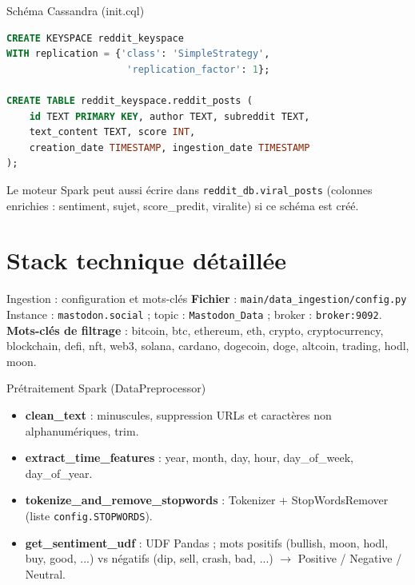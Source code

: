 \documentclass[11pt,aspectratio=169]{beamer}
\begin{document}
\begin{frame}{Schéma Cassandra (init.cql)}
  \begin{lstlisting}[language=SQL]
CREATE KEYSPACE reddit_keyspace
WITH replication = {'class': 'SimpleStrategy',
                     'replication_factor': 1};

CREATE TABLE reddit_keyspace.reddit_posts (
    id TEXT PRIMARY KEY, author TEXT, subreddit TEXT,
    text_content TEXT, score INT,
    creation_date TIMESTAMP, ingestion_date TIMESTAMP
);
  \end{lstlisting}
  Le moteur Spark peut aussi écrire dans \texttt{reddit\_db.viral\_posts} (colonnes enrichies : sentiment, sujet, score\_predit, viralite) si ce schéma est créé.
\end{frame}

\section{Stack technique détaillée}

\begin{frame}{Ingestion : configuration et mots-clés}
  \textbf{Fichier} : \texttt{main/data\_ingestion/config.py}\\
  Instance : \texttt{mastodon.social} ; topic : \texttt{Mastodon\_Data} ; broker : \texttt{broker:9092}.\\
  \vspace{0.3em}
  \textbf{Mots-clés de filtrage} : bitcoin, btc, ethereum, eth, crypto, cryptocurrency, blockchain, defi, nft, web3, solana, cardano, dogecoin, doge, altcoin, trading, hodl, moon.
\end{frame}

\begin{frame}{Prétraitement Spark (DataPreprocessor)}
  \begin{itemize}[leftmargin=*]
    \item \textbf{clean\_text} : minuscules, suppression URLs et caractères non alphanumériques, trim.
    \item \textbf{extract\_time\_features} : year, month, day, hour, day\_of\_week, day\_of\_year.
    \item \textbf{tokenize\_and\_remove\_stopwords} : Tokenizer + StopWordsRemover (liste \texttt{config.STOPWORDS}).
    \item \textbf{get\_sentiment\_udf} : UDF Pandas ; mots positifs (bullish, moon, hodl, buy, good, ...) vs négatifs (dip, sell, crash, bad, ...) $\rightarrow$ Positive / Negative / Neutral.
  \end{itemize}
\end{frame}
\end{document}
